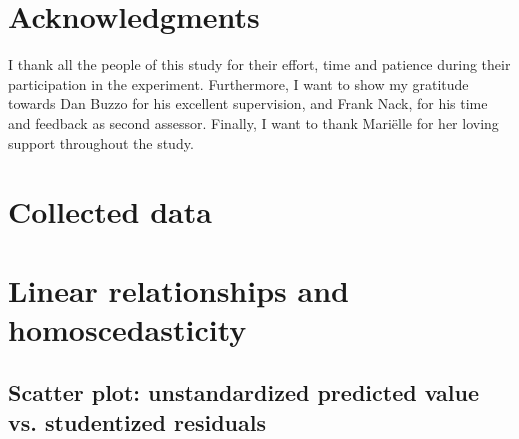 \documentclass{sigchi}
\begin{document}
\section{Acknowledgments} %
\label{sec:acknowledgments}
I thank all the people of this study for their effort, time and patience during their participation in the experiment. Furthermore, I want to show my gratitude towards Dan Buzzo for his excellent supervision, and Frank Nack, for his time and feedback as second assessor. Finally, I want to thank Mari\"{e}lle for her loving support throughout the study.









\clearpage
\onecolumn

\appendix
\section{Collected data} %
\label{sec:collected_data}


\section{Linear relationships and homoscedasticity}
\label{app:linear_relationships}

\subsection{Scatter plot: unstandardized predicted value vs. studentized residuals}
\hfill \break

\clearpage
\end{document}
